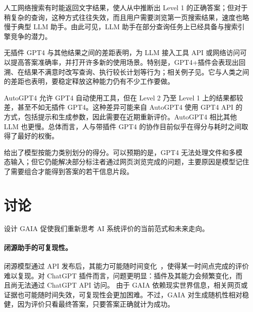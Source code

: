 \documentclass{fairmeta}
\newcommand{\benchmark}{\textsc{GAIA}}
\begin{document}
人工网络搜索有时能返回文字结果，使人从中推断出 Level 1 的正确答案；但对于稍复杂的查询，这种方式往往失效，而且用户需要浏览第一页搜索结果，速度也略慢于典型 LLM 助手。由此可见，LLM 助手在部分查询任务上已经具备与搜索引擎竞争的潜力。

无插件 GPT4 与其他结果之间的差距表明，为 LLM 接入工具 API 或网络访问可以提高答案准确率，并打开许多新的使用场景。特别是，GPT4+插件会表现出回溯、在结果不满意时改写查询、执行较长计划等行为；相关例子见。它与人类之间的差距也表明，要稳定释放这种能力仍有不少工作要做。

AutoGPT4 允许 GPT4 自动使用工具，但在 Level 2 乃至 Level 1 上的结果都较差，甚至不如无插件 GPT4。这种差异可能来自 AutoGPT4 使用 GPT4 API 的方式，包括提示和生成参数，因此需要在近期重新评价。AutoGPT4 相比其他 LLM 也更慢。总体而言，人与带插件 GPT4 的协作目前似乎在得分与耗时之间取得了最好的权衡。

 给出了模型按能力类别划分的得分。可以预期的是，GPT4 无法处理文件和多模态输入；但它仍能解决部分标注者通过网页浏览完成的问题，主要原因是模型记住了需要组合才能得到答案的若干信息片段。

\vspace{-.3cm}

\section{讨论}

\vspace{-.2cm}

设计 \benchmark{} 促使我们重新思考 AI 系统评价的当前范式和未来走向。

\vspace{-.2cm}

\paragraph{闭源助手的可复现性。} 闭源模型通过 API 发布后，其能力可能随时间变化~\citep{chen2023chatgpts}，使得某一时间点完成的评价难以复现。对 ChatGPT 插件而言，问题更明显：插件及其能力会频繁变化，而且尚无法通过 ChatGPT API 访问。%
由于 \benchmark{} 依赖现实世界信息，相关网页或证据也可能随时间失效，可复现性会更加困难。不过，\benchmark{} 对生成随机性相对稳健，因为评价只看最终答案，只要答案正确就计为成功。
\end{document}
